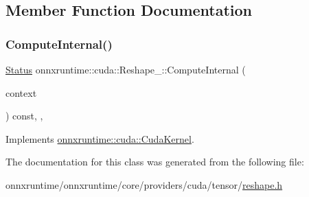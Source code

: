 \subsection{Member Function Documentation}
\mbox{\label{classonnxruntime_1_1cuda_1_1Reshape__1_ae2c8570939f5fb4640bda8f4961fff42}} 
\subsubsection{\texorpdfstring{Compute\+Internal()}{ComputeInternal()}}
{\footnotesize\ttfamily \mbox{\hyperlink{classonnxruntime_1_1common_1_1Status}{Status}} onnxruntime\+::cuda\+::\+Reshape\+\_\+::\+Compute\+Internal (\begin{DoxyParamCaption}\item[{\mbox{\hyperlink{classonnxruntime_1_1OpKernelContext}{Op\+Kernel\+Context}} $\ast$}]{context }\end{DoxyParamCaption}) const\hspace{0.3cm}{\ttfamily [inline]}, {\ttfamily [override]}, {\ttfamily [virtual]}}



Implements \mbox{\hyperlink{classonnxruntime_1_1cuda_1_1CudaKernel_aca7af04ae448017d6023d30bba231ebb}{onnxruntime\+::cuda\+::\+Cuda\+Kernel}}.



The documentation for this class was generated from the following file\+:\begin{DoxyCompactItemize}
\item 
onnxruntime/onnxruntime/core/providers/cuda/tensor/\mbox{\hyperlink{cuda_2tensor_2reshape_8h}{reshape.\+h}}\end{DoxyCompactItemize}
